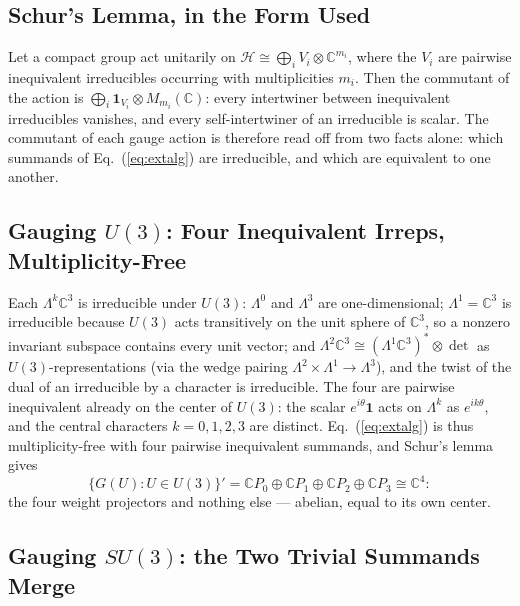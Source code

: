 \documentclass[11pt]{article}
\newcommand{\CC}{\mathbb{C}}
\begin{document}
\subsection{Schur's Lemma, in the Form Used}

Let a compact group act unitarily on $\mathcal{H} \cong \bigoplus_i V_i \otimes \CC^{m_i}$, where the $V_i$ are pairwise inequivalent irreducibles occurring with multiplicities $m_i$. Then the commutant of the action is $\bigoplus_i \mathbf{1}_{V_i} \otimes M_{m_i}(\CC)$: every intertwiner between inequivalent irreducibles vanishes, and every self-intertwiner of an irreducible is scalar. The commutant of each gauge action is therefore read off from two facts alone: which summands of Eq.~(\ref{eq:extalg}) are irreducible, and which are equivalent to one another.

\subsection{Gauging \texorpdfstring{$U(3)$}{U(3)}: Four Inequivalent Irreps, Multiplicity-Free}

Each $\Lambda^k \CC^3$ is irreducible under $U(3)$: $\Lambda^0$ and $\Lambda^3$ are one-dimensional; $\Lambda^1 = \CC^3$ is irreducible because $U(3)$ acts transitively on the unit sphere of $\CC^3$, so a nonzero invariant subspace contains every unit vector; and $\Lambda^2 \CC^3 \cong (\Lambda^1 \CC^3)^* \otimes \det$ as $U(3)$-representations (via the wedge pairing $\Lambda^2 \times \Lambda^1 \to \Lambda^3$), and the twist of the dual of an irreducible by a character is irreducible. The four are pairwise inequivalent already on the center of $U(3)$: the scalar $e^{i\theta}\mathbf{1}$ acts on $\Lambda^k$ as $e^{ik\theta}$, and the central characters $k = 0, 1, 2, 3$ are distinct. Eq.~(\ref{eq:extalg}) is thus multiplicity-free with four pairwise inequivalent summands, and Schur's lemma gives
\begin{equation*}
\{G(U) : U \in U(3)\}' = \CC P_0 \oplus \CC P_1 \oplus \CC P_2 \oplus \CC P_3 \cong \CC^4:
\end{equation*}
the four weight projectors and nothing else --- abelian, equal to its own center.

\subsection{Gauging \texorpdfstring{$SU(3)$}{SU(3)}: the Two Trivial Summands Merge}
\end{document}
